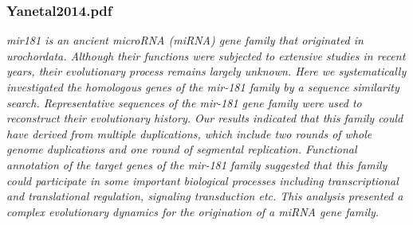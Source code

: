 \documentclass[graybox]{svmult}
\begin{document}

\iffalse
\subsubsection{Yanetal2014.pdf}

\cite{Yang2014}
\textit{mir181 is an ancient microRNA (miRNA) gene family that originated in urochordata. Although their functions were subjected to extensive studies in recent years, their evolutionary process remains largely unknown. Here we systematically investigated the homologous genes of the mir-181 family by a sequence similarity search. Representative sequences of the mir-181 gene family were used to reconstruct their evolutionary history. Our results indicated that this family could have derived from multiple duplications, which include two rounds of whole genome duplications and one round of segmental replication. Functional annotation of the target genes of the mir-181 family suggested that this family could participate in some important biological processes including transcriptional and translational regulation, signaling transduction etc. This analysis presented a complex evolutionary dynamics for the origination of a miRNA gene family.}
\end{document}
